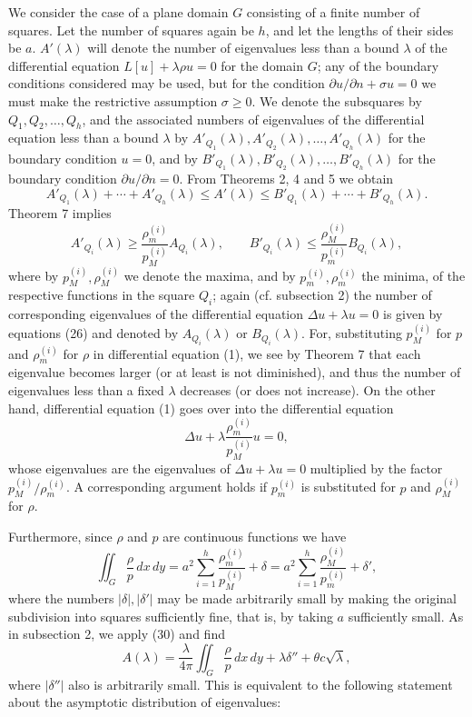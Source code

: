 We consider the case of a plane domain $G$ consisting of a finite number of squares. Let the number of squares again be $h$, and let the lengths of their sides be $a$. $A'(\lambda)$ will denote the number of eigenvalues less than a bound $\lambda$ of the differential equation $L[u]+\lambda\rho u=0$ for the domain $G$; any of the boundary conditions considered may be used, but for the condition $\partial u/\partial n+\sigma u=0$ we must make the restrictive assumption $\sigma\ge0$. We denote the subsquares by $Q_1,Q_2,\ldots,Q_h$, and the associated numbers of eigenvalues of the differential equation less than a bound $\lambda$ by $A'_{Q_1}(\lambda),A'_{Q_2}(\lambda),\ldots,A'_{Q_h}(\lambda)$ for the boundary condition $u=0$, and by $B'_{Q_1}(\lambda),B'_{Q_2}(\lambda),\ldots,B'_{Q_h}(\lambda)$ for the boundary condition $\partial u/\partial n=0$. From Theorems 2, 4 and 5 we obtain
\begin{equation}\tag{30}
A'_{Q_1}(\lambda)+\cdots+A'_{Q_h}(\lambda)\le A'(\lambda)
\le B'_{Q_1}(\lambda)+\cdots+B'_{Q_h}(\lambda).
\end{equation}
Theorem 7 implies
\[
A'_{Q_i}(\lambda)\ge\frac{\rho_m^{(i)}}{p_M^{(i)}}A_{Q_i}(\lambda),
\qquad
B'_{Q_i}(\lambda)\le\frac{\rho_M^{(i)}}{p_m^{(i)}}B_{Q_i}(\lambda),
\]
where by $p_M^{(i)},\rho_M^{(i)}$ we denote the maxima, and by $p_m^{(i)},\rho_m^{(i)}$ the minima, of the respective functions in the square $Q_i$; again (cf. subsection 2) the number of corresponding eigenvalues of the differential equation $\Delta u+\lambda u=0$ is given by equations (26) and denoted by $A_{Q_i}(\lambda)$ or $B_{Q_i}(\lambda)$. For, substituting $p_M^{(i)}$ for $p$ and $\rho_m^{(i)}$ for $\rho$ in differential equation (1), we see by Theorem 7 that each eigenvalue becomes larger (or at least is not diminished), and thus the number of eigenvalues less than a fixed $\lambda$ decreases (or does not increase). On the other hand, differential equation (1) goes over into the differential equation
\[
\Delta u+\lambda\frac{\rho_m^{(i)}}{p_M^{(i)}}u=0,
\]
whose eigenvalues are the eigenvalues of $\Delta u+\lambda u=0$ multiplied by the factor $p_M^{(i)}/\rho_m^{(i)}$. A corresponding argument holds if $p_m^{(i)}$ is substituted for $p$ and $\rho_M^{(i)}$ for $\rho$.

Furthermore, since $\rho$ and $p$ are continuous functions we have
\[
\iint_G\frac{\rho}{p}\,dx\,dy
=a^2\sum_{i=1}^h\frac{\rho_m^{(i)}}{p_M^{(i)}}+\delta
=a^2\sum_{i=1}^h\frac{\rho_M^{(i)}}{p_m^{(i)}}+\delta',
\]
where the numbers $|\delta|,|\delta'|$ may be made arbitrarily small by making the original subdivision into squares sufficiently fine, that is, by taking $a$ sufficiently small. As in subsection 2, we apply (30) and find
\[
A(\lambda)=\frac{\lambda}{4\pi}\iint_G\frac{\rho}{p}\,dx\,dy
+\lambda\delta''+\theta c\sqrt\lambda,
\]
where $|\delta''|$ also is arbitrarily small. This is equivalent to the following statement about the asymptotic distribution of eigenvalues:

